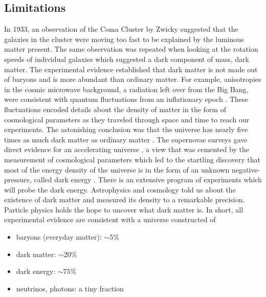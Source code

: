 \subsection*{Limitations}
In 1933, an observation of the Coma Cluster by Zwicky suggested that the galaxies in the cluster were moving too fast to be explained 
by the luminous matter present\cite{1933AcHPh}. 
The same observation was repeated when looking at the rotation speeds of individual galaxies which 
suggested a dark component of mass, dark matter. 
The experimental evidence established that dark matter is not made out of baryons
and is more abundant than ordinary matter.
For example, anisotropies in the cosmic microwave background, a radiation 
left over from the Big Bang, were consistent with 
quantum fluctuations from an inflationary epoch \cite{Hu:2001bc,2009AIPC}. 
These fluctuations encoded details about the density of matter 
in the form of 
cosmological parameters as they traveled through space and time to reach 
our experiments.
The astonishing conclusion was that the universe has nearly five times 
as much dark matter as ordinary matter \cite{Bertone:2004pz}.
The supernovae surveys gave direct evidence for an accelerating universe
 \cite{Perlmutter:1998np},
a view that was cemented by the measurement of cosmological parameters
\cite{Adam:2015rua,Ade:2015xua}
which led to the startling discovery that most of the energy density of 
the universe is in the 
form of an unknown negative-pressure, called dark energy \cite{Scranton:2003in}.
There is an extensive program of experiments 
which will probe the dark energy. %
Astrophysics and cosmology told us about 
the existence of dark matter and measured its density to a remarkable 
precision. Particle physics holds the hope to uncover what dark matter is.
In short, all experimental evidence are consistent with a universe 
constructed of 
\begin{itemize}
\item baryons (everyday matter): $\sim 5\%$ 
\item dark matter: $\sim 20\%$ 
\item dark energy: $\sim 75\%$ 
\item neutrinos, photons: a tiny fraction
\end{itemize}

